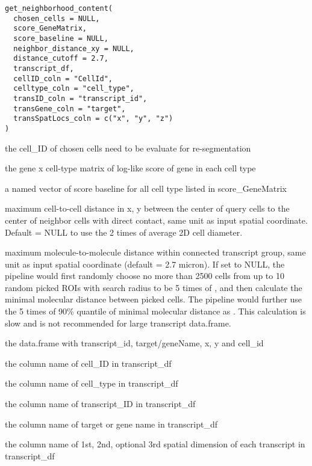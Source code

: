 \documentclass[letterpaper]{book}
\begin{document}
%
\begin{Usage}
\begin{verbatim}
get_neighborhood_content(
  chosen_cells = NULL,
  score_GeneMatrix,
  score_baseline = NULL,
  neighbor_distance_xy = NULL,
  distance_cutoff = 2.7,
  transcript_df,
  cellID_coln = "CellId",
  celltype_coln = "cell_type",
  transID_coln = "transcript_id",
  transGene_coln = "target",
  transSpatLocs_coln = c("x", "y", "z")
)
\end{verbatim}
\end{Usage}
%
\begin{Arguments}
\begin{ldescription}
\item[\code{chosen\_cells}] the cell\_ID of chosen cells need to be evaluate for re-segmentation

\item[\code{score\_GeneMatrix}] the gene x cell-type matrix of log-like score of gene in each cell type

\item[\code{score\_baseline}] a named vector of score baseline for all cell type listed in score\_GeneMatrix

\item[\code{neighbor\_distance\_xy}] maximum cell-to-cell distance in x, y between the center of query cells to the center of neighbor cells with direct contact, same unit as input spatial coordinate. Default = NULL to use the 2 times of average 2D cell diameter.

\item[\code{distance\_cutoff}] maximum molecule-to-molecule distance within connected transcript group, same unit as input spatial coordinate (default = 2.7 micron).
If set to NULL, the pipeline would first randomly choose no more than 2500 cells from up to 10 random picked ROIs with search radius to be 5 times of , and then calculate the minimal molecular distance between picked cells. The pipeline would further use the 5 times of 90\% quantile of minimal molecular distance as . This calculation is slow and is not recommended for large transcript data.frame.

\item[\code{transcript\_df}] the data.frame with transcript\_id, target/geneName, x, y and cell\_id

\item[\code{cellID\_coln}] the column name of cell\_ID in transcript\_df

\item[\code{celltype\_coln}] the column name of cell\_type in transcript\_df

\item[\code{transID\_coln}] the column name of transcript\_ID in transcript\_df

\item[\code{transGene\_coln}] the column name of target or gene name in transcript\_df

\item[\code{transSpatLocs\_coln}] the column name of 1st, 2nd, optional 3rd spatial dimension of each transcript in transcript\_df
\end{ldescription}
\end{Arguments}
\end{document}
